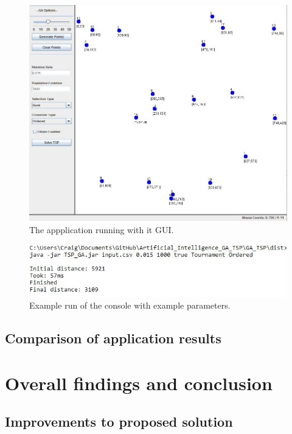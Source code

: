 \documentclass[article]{IEEEtran}
\begin{document}
\begin{figure}[H]
\centering
  \includegraphics[width=.8\linewidth]{images/GUI}
  \caption{The appplication running with it GUI.}
  \label{fig:6}
\end{figure}

\begin{figure}[H]
\centering
  \includegraphics[width=.9\linewidth]{images/commandLine}
  \caption{Example run of the console with example parameters.}
  \label{fig:7}
\end{figure}

\subsection{Comparison of application results}


\section{Overall findings and conclusion}

\subsection{Improvements to proposed solution}
\end{document}
